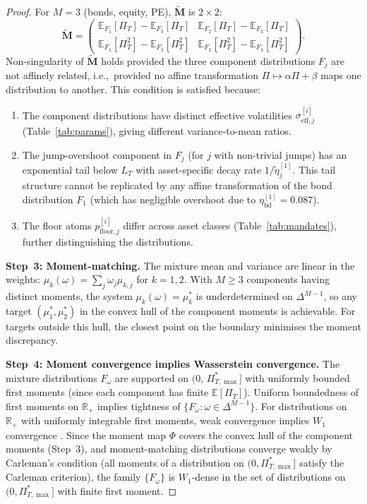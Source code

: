 \documentclass[11pt,a4paper]{article}
\numberwithin{equation}{section}
\newcommand{\E}{\mathbb{E}}
\newcommand{\R}{\mathbb{R}}
\newcommand{\ie}{\textrm{i.e.,}}
\begin{document}
\begin{appendices}
\begin{proof}
For $M = 3$ (bonds, equity, PE), $\tilde{\mathbf{M}}$ is $2 \times 2$:
\begin{equation}\label{eq:M_tilde}
\tilde{\mathbf{M}} = \begin{pmatrix}
\E_{F_1}[\Pi_T] - \E_{F_3}[\Pi_T] & \E_{F_2}[\Pi_T] - \E_{F_3}[\Pi_T] \\
\E_{F_1}[\Pi_T^2] - \E_{F_3}[\Pi_T^2] & \E_{F_2}[\Pi_T^2] - \E_{F_3}[\Pi_T^2]
\end{pmatrix}.
\end{equation}
Non-singularity of $\tilde{\mathbf{M}}$ holds provided the three component distributions $F_j$ are not affinely related, \ie\ provided no affine transformation $\Pi \mapsto \alpha\Pi + \beta$ maps one distribution to another.  This condition is satisfied because:
\begin{enumerate}[label=(\alph*)]
\item The component distributions have distinct effective volatilities $\sigma^{[i]}_{\mathrm{eff},j}$ (Table~\ref{tab:params}), giving different variance-to-mean ratios.
\item The jump-overshoot component in $F_j$ (for $j$ with non-trivial jumps) has an exponential tail below $L_T$ with asset-specific decay rate $1/\tilde\eta^{[1]}_j$.  This tail structure cannot be replicated by any affine transformation of the bond distribution $F_1$ (which has negligible overshoot due to $\eta^{[1]}_{\mathrm{bd}} = 0.087$).
\item The floor atoms $p^{[i]}_{\mathrm{floor},j}$ differ across asset classes (Table~\ref{tab:mandates}), further distinguishing the distributions.
\end{enumerate}

\medskip\noindent\textbf{Step~3: Moment-matching.}
The mixture mean and variance are linear in the weights: 
$\mu_k(\omega) = \sum_j \omega_j \mu_{k,j}$ for $k = 1, 2$. With 
$M \geq 3$ components having distinct moments, the system 
$\mu_k(\omega) = \mu^*_k$ is underdetermined on $\Delta^{M-1}$, so any 
target $(\mu^*_1, \mu^*_2)$ in the convex hull of the component moments 
is achievable. For targets outside this hull, the closest point on the 
boundary minimises the moment discrepancy.

\medskip\noindent\textbf{Step~4: Moment convergence implies Wasserstein 
convergence.}
The mixture distributions $F_\omega$ are supported on 
$(0,\, \Pi^*_{T,\max}]$ with uniformly bounded first moments 
(since each component has finite $\E[\Pi_T]$). Uniform boundedness of 
first moments on $\R_+$ implies tightness of $\{F_\omega : \omega \in 
\Delta^{M-1}\}$. For distributions on $\R_+$ with uniformly integrable 
first moments, weak convergence implies $W_1$ convergence \citep[see][for the general theory]{LindsayMixtures1995}. Since the 
moment map $\Phi$ covers the convex hull of the component moments 
(Step~3), and moment-matching distributions converge weakly by 
Carleman's condition (all moments of a distribution on 
$(0, \Pi^*_{T,\max}]$ satisfy the Carleman criterion), the family 
$\{F_\omega\}$ is $W_1$-dense in the set of distributions on 
$(0, \Pi^*_{T,\max}]$ with finite first moment.


\end{proof}
\end{appendices}
\end{document}
